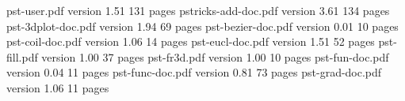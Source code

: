 \begin{thebibliography}{99}
 pst-user.pdf  \hspace{1cm}	version 1.51  \hspace{1cm} 	131 pages  \hspace{1cm} 	\DGB
    pstricks-add-doc.pdf  \hspace{1cm}	version 3.61 \hspace{1cm} 	134 pages 	\hspace{1cm}	\DGB
{} pst-3dplot-doc.pdf  \hspace{1cm}	version 1.94 \hspace{1cm} 	69 pages \hspace{1cm}	\DGB
{} pst-bezier-doc.pdf  \hspace{1cm}	version 0.01 \hspace{1cm} 	10 pages 	\hspace{1cm}	\DGB
{} pst-coil-doc.pdf  \hspace{1cm}	version 1.06 \hspace{1cm} 	14 pages 	\hspace{1cm}	\DGB
{} pst-eucl-doc.pdf \hspace{1cm}	version 1.51 \hspace{1cm}	52 pages 	\hspace{1cm}	\DGB
{} pst-fill.pdf     \hspace{1cm}	version 1.00 \hspace{1cm}	37 pages 	\hspace{1cm}  	\DGB
{} pst-fr3d.pdf   \hspace{1cm}	version 1.00 \hspace{1cm}	10 pages 	\hspace{1cm} 	\DGB
{} pst-fun-doc.pdf   \hspace{1cm}	version 0.04 \hspace{1cm}	11 pages 	\hspace{1cm} 	\DGB
{} pst-func-doc.pdf   \hspace{1cm}	version 0.81 \hspace{1cm}	73 pages 	\hspace{1cm} 	\DGB
{} pst-grad-doc.pdf \hspace{1cm}	version 1.06 \hspace{1cm}	11 pages 	\hspace{1cm}	\DGB

\end{thebibliography}
